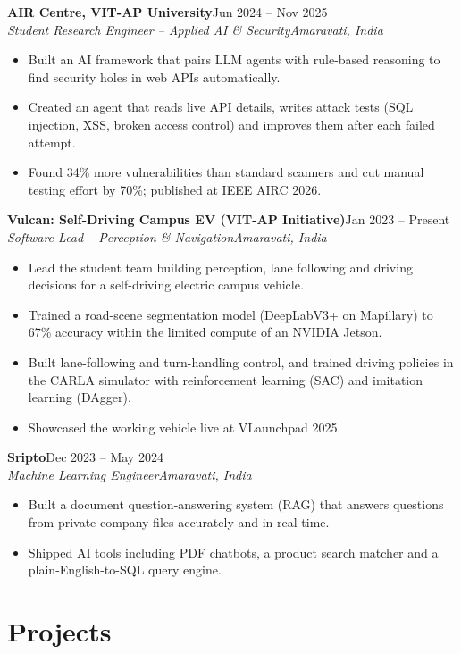 \documentclass[a4paper,10pt]{article}
\newcommand{\job}[4]{\textbf{#1}\hfill #2\\\textit{#3}\hfill\textit{#4}\par\vspace{-2pt}}
\newcommand{\gap}{\vspace{5pt}}
\begin{document}
\job{AIR Centre, VIT-AP University}{Jun 2024 -- Nov 2025}{Student Research Engineer -- Applied AI \& Security}{Amaravati, India}
\begin{itemize}
  \item Built an AI framework that pairs LLM agents with rule-based reasoning to find security holes in web APIs automatically.
  \item Created an agent that reads live API details, writes attack tests (SQL injection, XSS, broken access control) and improves them after each failed attempt.
  \item Found 34\% more vulnerabilities than standard scanners and cut manual testing effort by 70\%; published at IEEE AIRC 2026.
\end{itemize}
\gap

\job{Vulcan: Self-Driving Campus EV (VIT-AP Initiative)}{Jan 2023 -- Present}{Software Lead -- Perception \& Navigation}{Amaravati, India}
\begin{itemize}
  \item Lead the student team building perception, lane following and driving decisions for a self-driving electric campus vehicle.
  \item Trained a road-scene segmentation model (DeepLabV3+ on Mapillary) to 67\% accuracy within the limited compute of an NVIDIA Jetson.
  \item Built lane-following and turn-handling control, and trained driving policies in the CARLA simulator with reinforcement learning (SAC) and imitation learning (DAgger).
  \item Showcased the working vehicle live at VLaunchpad 2025.
\end{itemize}
\gap

\job{Sripto}{Dec 2023 -- May 2024}{Machine Learning Engineer}{Amaravati, India}
\begin{itemize}
  \item Built a document question-answering system (RAG) that answers questions from private company files accurately and in real time.
  \item Shipped AI tools including PDF chatbots, a product search matcher and a plain-English-to-SQL query engine.
\end{itemize}

\section{Projects}
\end{document}
